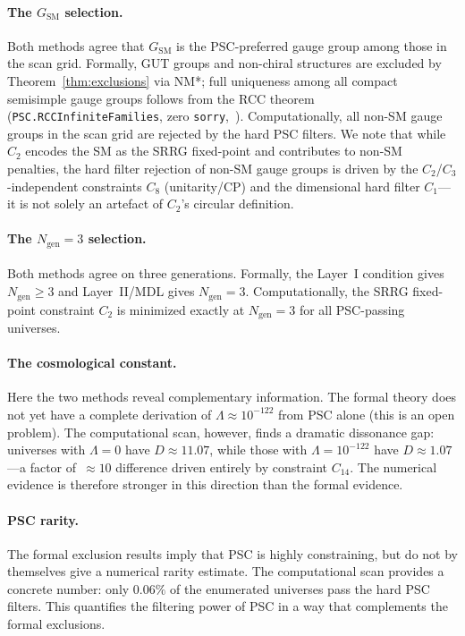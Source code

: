 \documentclass[11pt,twocolumn]{article}
\theoremstyle{remark}
\begin{document}
\paragraph{The $G_{\mathrm{SM}}$ selection.}
Both methods agree that $G_{\mathrm{SM}}$ is the PSC-preferred
gauge group among those in the scan grid.
Formally, GUT groups and non-chiral structures are excluded by
Theorem~\ref{thm:exclusions} via NM*; full uniqueness among all
compact semisimple gauge groups follows from the RCC theorem
(\texttt{PSC.RCCInfiniteFamilies}, zero \texttt{sorry},~\cite{ugp-lean}).
Computationally, all non-SM gauge groups in the scan grid are
rejected by the hard PSC filters.
We note that while $C_2$ encodes the SM as the SRRG fixed-point and
contributes to non-SM penalties, the hard filter rejection of non-SM
gauge groups is driven by the $C_2$/$C_3$-independent constraints
$C_8$ (unitarity/CP) and the dimensional hard filter $C_1$---it is
not solely an artefact of $C_2$'s circular definition.

\paragraph{The $N_{\mathrm{gen}}=3$ selection.}
Both methods agree on three generations.
Formally, the Layer~I condition gives $N_{\mathrm{gen}}\geq 3$ and
Layer~II/MDL gives $N_{\mathrm{gen}}=3$.
Computationally, the SRRG fixed-point constraint $C_2$ is minimized
exactly at $N_{\mathrm{gen}}=3$ for all PSC-passing universes.

\paragraph{The cosmological constant.}
Here the two methods reveal complementary information.
The formal theory does not yet have a complete derivation of
$\Lambda\approx 10^{-122}$ from PSC alone (this is an open problem).
The computational scan, however, finds a dramatic dissonance gap:
universes with $\Lambda=0$ have $D\approx 11.07$, while those with
$\Lambda=10^{-122}$ have $D\approx 1.07$—a factor of~$\approx 10$
difference driven entirely by constraint $C_{14}$.
The numerical evidence is therefore stronger in this direction than
the formal evidence.

\paragraph{PSC rarity.}
The formal exclusion results imply that PSC is highly constraining,
but do not by themselves give a numerical rarity estimate.
The computational scan provides a concrete number: only $0.06\%$
of the enumerated universes pass the hard PSC filters.
This quantifies the filtering power of PSC in a way that complements
the formal exclusions.
\end{document}
